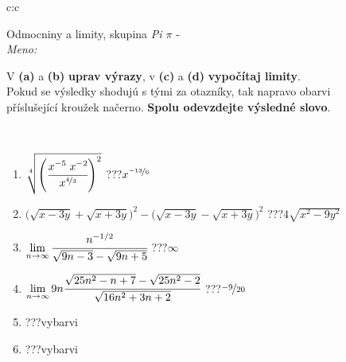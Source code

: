 \documentclass[10pt]{report}
\begin{document}
\newpage
\thispagestyle{empty}
\begin{tabular}{c:c}
\begin{minipage}[c][104.5mm][t]{0.5\linewidth}
\begin{center}
\vspace{7mm}
{\huge Odmocniny a limity, skupina \textit{Pi $\pi$} -}\\[5mm]
\textit{Meno:}\phantom{xxxxxxxxxxxxxxxxxxxxxxxxxxxxxxxxxxxxxxxxxxxxxxxxxxxxxxxxxxxxxxxxx}\\[5mm]
\begin{minipage}{0.95\linewidth}
\begin{center}
V \textbf{(a)} a \textbf{(b)} \textbf{uprav výrazy}, v \textbf{(c)} a \textbf{(d)} \textbf{vypočítaj limity}.\\Pokud se výsledky shodujú s tými za otazníky, tak napravo obarvi\\příslušející kroužek načerno. \textbf{Spolu odevzdejte výsledné slovo}.
\end{center}
\end{minipage}
\\[1mm]
\begin{minipage}{0.79\linewidth}
\begin{center}
\begin{varwidth}{\linewidth}
\begin{enumerate}
\small
\item $\sqrt[4]{\left(\cfrac{x^{-5}\;x^{-2}}{x^{\nicefrac{4}{3}}}\right)^{2}}$\quad \dotfill\; ???\;\dotfill \quad $x^{\nicefrac{-13}{6}}$
\item {\footnotesize{\scriptsize$\big(\sqrt{x-3y}+\sqrt{x+3y}\big)^2-\big(\sqrt{x-3y}-\sqrt{x+3y}\big)^2$}\quad \dotfill\; ???\;\dotfill \quad $4\sqrt{x^2-9y^2}$}
\item $\lim\limits_{n\to\infty}\cfrac{n^{-1/2}}{\sqrt{9n-3}-\sqrt{9n+5}}$\quad \dotfill\; ???\;\dotfill \quad $\infty$
\item $\lim\limits_{n\to\infty}9n\cfrac{\sqrt{25n^2-n+7}-\sqrt{25n^2-2}}{\sqrt{16n^2+3n+2}}$\quad \dotfill\; ???\;\dotfill \quad $\nicefrac{-9}{20}$
\item \quad \dotfill\; ???\;\dotfill \quad vybarvi
\item \quad \dotfill\; ???\;\dotfill \quad vybarvi
\end{enumerate}
\end{varwidth}
\end{center}
\end{minipage}
\begin{minipage}{0.20\linewidth}

\end{minipage}
\end{center}
\end{minipage}
\end{tabular}
\end{document}
